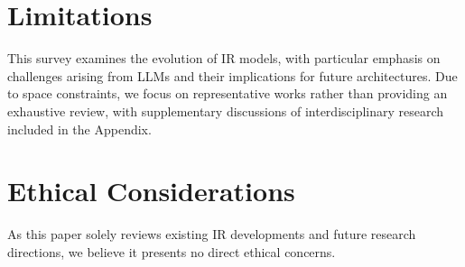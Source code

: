 \section*{Limitations}
This survey examines the evolution of IR models, with particular emphasis on challenges arising from LLMs and their implications for future architectures. 
Due to space constraints, we focus on representative works rather than providing an exhaustive review, with supplementary discussions of interdisciplinary research included in the Appendix. 

\section*{Ethical Considerations}
As this paper solely reviews existing IR developments and future research directions, we believe it presents no direct ethical concerns.